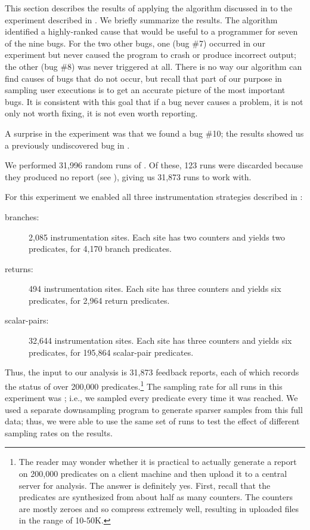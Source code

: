 This section describes the results of applying the algorithm discussed
in  to the experiment described in
.  We briefly summarize the results.
The algorithm identified a highly-ranked cause that would be useful to a programmer
for seven of the nine bugs.  For the two other bugs,
one (bug \#7) occurred in our experiment but never caused
the program to crash or produce incorrect output; the other (bug \#8) was never
triggered at all.  There is no way our algorithm can find causes of bugs that do not
occur, but recall that part of our purpose in sampling user executions
is to get an accurate picture of the most important bugs. It is consistent with
this goal that if a bug never causes a problem, it is not only not worth fixing,
it is not even worth reporting.

A surprise in the experiment was that we found a bug \#10; the results
showed us a previously undiscovered bug in \moss.

We performed 31,996 random runs of \moss.  Of these, 123 runs were
discarded because they produced no report (see
), giving us 31,873 runs to work with.

For this experiment we enabled all three instrumentation strategies
described in :

\begin{description}
\item[branches:] 2,085 instrumentation sites.  Each site has two
  counters and yields two predicates, for 4,170 branch predicates.

\item[returns:] 494 instrumentation sites.  Each site has three
  counters and yields six predicates, for 2,964 return predicates.

\item[scalar-pairs:] 32,644 instrumentation sites.  Each site has
  three counters and yields six predicates, for 195,864 scalar-pair
  predicates.
\end{description}

Thus, the input to our analysis is 31,873 feedback reports, each of
which records the status of over 200,000 predicates.\footnote{The
reader may wonder whether it is practical to actually generate a
report on 200,000 predicates on a client machine and then upload it to
a central server for analysis.  The answer is definitely yes.  First,
recall that the predicates are synthesized from about half as many
counters.  The counters are mostly zeroes and so compress extremely
well, resulting in uploaded files in the range of 10-50K.}  The
sampling rate for all runs in this experiment was ;
i.e., we sampled every predicate every time it was reached.  We used a
separate downsampling program to generate sparser samples from this
full data; thus, we were able to use the same set of runs to test the
effect of different sampling rates on the results.

